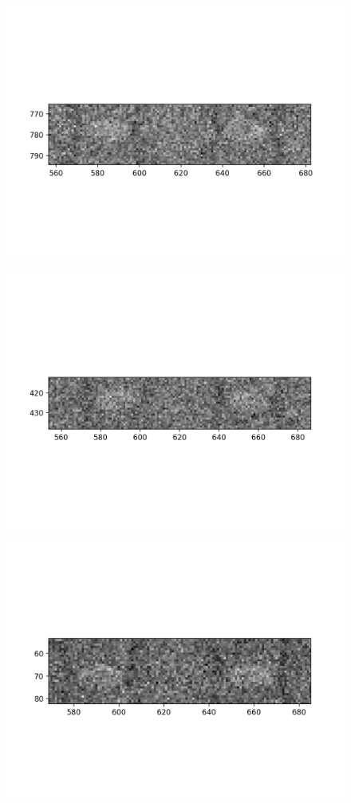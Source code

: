 \documentclass[10pt,a4paper]{article}
\begin{document}
\begin{figure}
	\includegraphics{data/image_stamps/a1}
\end{figure}
\begin{figure}
\includegraphics{data/image_stamps/a2}	
\end{figure}
\begin{figure}
\includegraphics{data/image_stamps/a3} 
\end{figure}
\end{document}
